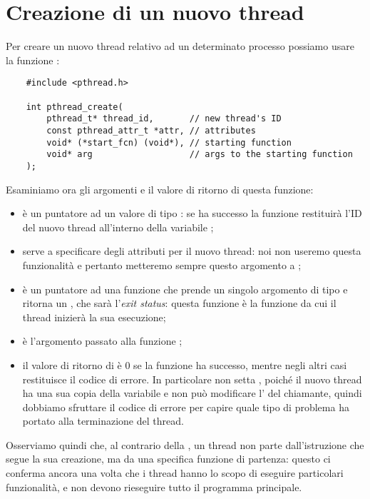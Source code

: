 \section{Creazione di un nuovo thread}

Per creare un nuovo thread relativo ad un determinato processo possiamo usare la funzione :

\begin{verbatim}
    #include <pthread.h>

    int pthread_create(
        pthread_t* thread_id,       // new thread's ID
        const pthread_attr_t *attr, // attributes
        void* (*start_fcn) (void*), // starting function
        void* arg                   // args to the starting function
    );
\end{verbatim}

Esaminiamo ora gli argomenti e il valore di ritorno di questa funzione:
\begin{itemize}
    \item {} è un puntatore ad un valore di tipo : se  ha successo la funzione restituirà l'ID del nuovo thread all'interno della variabile ;
    \item {} serve a specificare degli attributi per il nuovo thread: noi non useremo questa funzionalità e pertanto metteremo sempre questo argomento a ;
    \item {} è un puntatore ad una funzione che prende un singolo argomento di tipo  e ritorna un , che sarà l'\emph{exit status}: questa funzione è la funzione da cui il thread inizierà la sua esecuzione;
    \item {} è l'argomento passato alla funzione ;
    \item il valore di ritorno di  è $0$ se la funzione ha successo, mentre negli altri casi restituisce il codice di errore. In particolare  non setta , poiché il nuovo thread ha una sua copia della variabile e non può modificare l' del chiamante, quindi dobbiamo sfruttare il codice di errore per capire quale tipo di problema ha portato alla terminazione del thread.
\end{itemize}

Osserviamo quindi che, al contrario della , un thread non parte dall'istruzione che segue la sua creazione, ma da una specifica funzione di partenza: questo ci conferma ancora una volta che i thread hanno lo scopo di eseguire particolari funzionalità, e non devono rieseguire tutto il programma principale.

